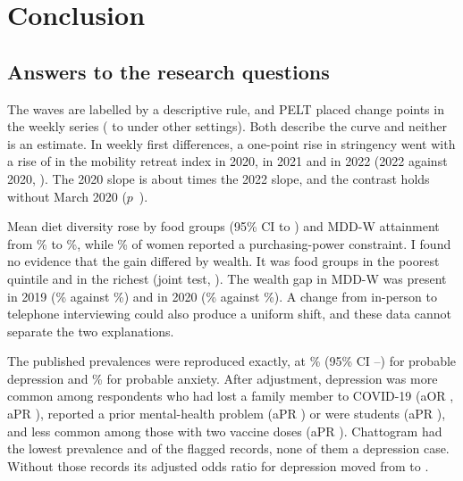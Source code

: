 \chapter{Conclusion}\label{ch:conclusion}

\section{Answers to the research questions}
\begin{description}[leftmargin=1.2cm,style=nextline]
  \item[RQ1] The \NWaves{} waves are labelled by a descriptive rule, and PELT placed \NChangepoints{} change points in the weekly series (\NChangepointsLo{} to \NChangepointsHi{} under other settings). Both describe the curve and neither is an estimate. In weekly first differences, a one-point rise in stringency went with a rise of \PolSlopeA{} in the mobility retreat index in 2020, \PolSlopeB{} in 2021 and \PolSlopeC{} in 2022 (2022 against 2020, \PolIntCp). The 2020 slope is about \PolRatio{} times the 2022 slope, and the contrast holds without March 2020 ($p$~\PolIntCpNoMarch).
  \item[RQ2] Mean diet diversity rose by \PanFgDiff{} food groups (95\% CI \PanFgCIlo{} to \PanFgCIhi) and MDD-W attainment from \PanMddBefore\% to \PanMddAfter\%, while \PanPPP\% of women reported a purchasing-power constraint. I found no evidence that the gain differed by wealth. It was \PanGainQOne{} food groups in the poorest quintile and \PanGainQFive{} in the richest (joint test, \PanChgP). The wealth gap in MDD-W was present in 2019 (\PanQOneMddB\% against \PanQFiveMddB\%) and in 2020 (\PanQOneMddA\% against \PanQFiveMddA\%). A change from in-person to telephone interviewing could also produce a uniform shift, and these data cannot separate the two explanations.
  \item[RQ3] The published prevalences were reproduced exactly, at \PrevDep\% (95\% CI \PrevDepLo--\PrevDepHi) for probable depression and \PrevAnx\% for probable anxiety. After adjustment, depression was more common among respondents who had lost a family member to COVID-19 (aOR \OrFamDeathB, aPR \PrFamDeathB), reported a prior mental-health problem (aPR \PrHistB) or were students (aPR \PrStudentB), and less common among those with two vaccine doses (aPR \PrTwoDoseB). Chattogram had the lowest prevalence and \SuspectChatto{} of the \SuspectN{} flagged records, none of them a depression case. Without those records its adjusted odds ratio for depression moved from \SensChattoAll{} to \SensChattoExcl.

\end{description}
